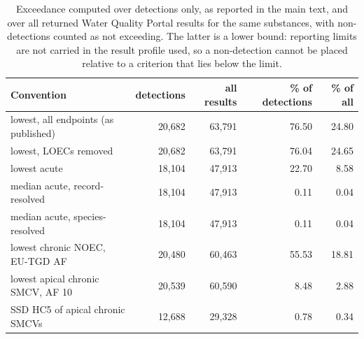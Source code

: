 \begin{table}[htbp]\centering\caption{Exceedance computed over detections only, as reported in the main text, and over all returned Water Quality Portal results for the same substances, with non-detections counted as not exceeding. The latter is a lower bound: reporting limits are not carried in the result profile used, so a non-detection cannot be placed relative to a criterion that lies below the limit.}\label{tab:s4}\footnotesize
\begin{tabular}{@{}l r r r r@{}}\toprule
Convention & detections & all results & \% of detections & \% of all \\\midrule
lowest, all endpoints (as published) & 20,682 & 63,791 & 76.50 & 24.80 \\
lowest, LOECs removed & 20,682 & 63,791 & 76.04 & 24.65 \\
lowest acute & 18,104 & 47,913 & 22.70 & 8.58 \\
median acute, record-resolved & 18,104 & 47,913 & 0.11 & 0.04 \\
median acute, species-resolved & 18,104 & 47,913 & 0.11 & 0.04 \\
lowest chronic NOEC, EU-TGD AF & 20,480 & 60,463 & 55.53 & 18.81 \\
lowest apical chronic SMCV, AF 10 & 20,539 & 60,590 & 8.48 & 2.88 \\
SSD HC5 of apical chronic SMCVs & 12,688 & 29,328 & 0.78 & 0.34 \\
\bottomrule\end{tabular}\end{table}
